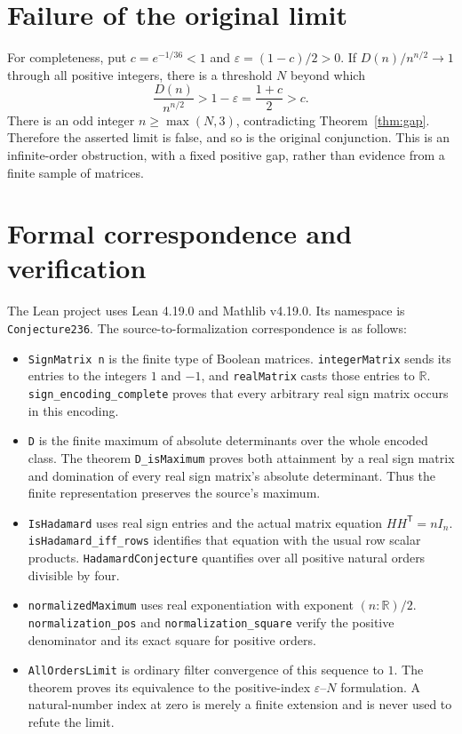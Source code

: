 \documentclass[11pt]{article}
\newcommand{\R}{\mathbb R}
\begin{document}
\section{Failure of the original limit}

For completeness, put $c=e^{-1/36}<1$ and
$\varepsilon=(1-c)/2>0$. If $D(n)/n^{n/2}\to1$ through all positive
integers, there is a threshold $N$ beyond which
\[
 \frac{D(n)}{n^{n/2}}>1-\varepsilon
 =\frac{1+c}{2}>c.
\]
There is an odd integer $n\geq\max(N,3)$, contradicting
Theorem~\ref{thm:gap}. Therefore the asserted limit is false, and so is
the original conjunction. This is an infinite-order obstruction, with a
fixed positive gap, rather than evidence from a finite sample of matrices.

\section{Formal correspondence and verification}

The Lean project uses Lean 4.19.0 and Mathlib v4.19.0. Its namespace is
\texttt{Conjecture236}. The source-to-formalization correspondence is as
follows:
\begin{itemize}\raggedright
\item \texttt{SignMatrix n} is the finite type of Boolean matrices.
\texttt{integerMatrix} sends its entries to the integers $1$ and $-1$,
and \texttt{realMatrix} casts those entries to $\R$.
\texttt{sign\_encoding\_complete} proves that every arbitrary real sign
matrix occurs in this encoding.
\item \texttt{D} is the finite maximum of absolute determinants over the
whole encoded class. The theorem \texttt{D\_isMaximum} proves both
attainment by a real sign matrix and domination of every real sign
matrix's absolute determinant. Thus the finite representation preserves
the source's maximum.
\item \texttt{IsHadamard} uses real sign entries and the actual matrix
equation $HH^{\mathsf T}=nI_n$.
\texttt{isHadamard\_iff\_rows} identifies that equation with the usual
row scalar products. \texttt{HadamardConjecture} quantifies over all
positive natural orders divisible by four.
\item \texttt{normalizedMaximum} uses real exponentiation with exponent
$(n:\R)/2$. \texttt{normalization\_pos} and
\texttt{normalization\_square} verify the positive denominator and its
exact square for positive orders.
\item \texttt{AllOrdersLimit} is ordinary filter convergence of this
sequence to $1$. The theorem
 proves its equivalence
to the positive-index $\varepsilon$--$N$ formulation. A natural-number
index at zero is merely a finite extension and is never used to refute
the limit.
\end{itemize}
\end{document}
